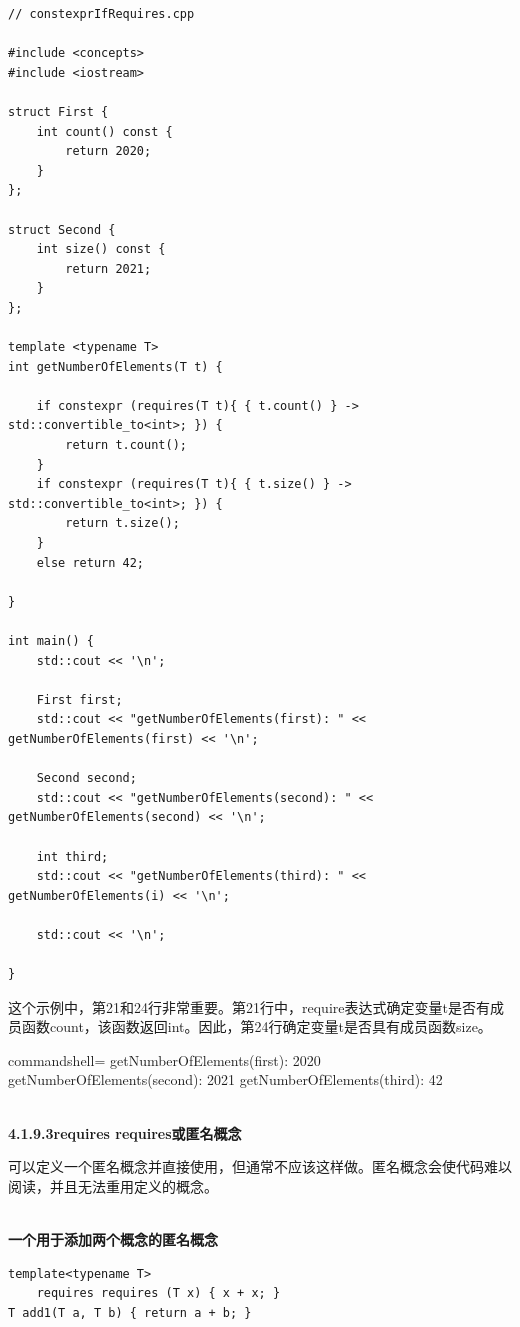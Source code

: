 \begin{lstlisting}[style=styleCXX]
// constexprIfRequires.cpp

#include <concepts>
#include <iostream>

struct First {
	int count() const {
		return 2020;
	}
};

struct Second {
	int size() const {
		return 2021;
	}
};

template <typename T>
int getNumberOfElements(T t) {

	if constexpr (requires(T t){ { t.count() } -> std::convertible_to<int>; }) {
		return t.count();
	}
	if constexpr (requires(T t){ { t.size() } -> std::convertible_to<int>; }) {
		return t.size();
	}
	else return 42;

}

int main() {
	std::cout << '\n';
	
	First first;
	std::cout << "getNumberOfElements(first): " << getNumberOfElements(first) << '\n';
	
	Second second;
	std::cout << "getNumberOfElements(second): " << getNumberOfElements(second) << '\n';
	
	int third;
	std::cout << "getNumberOfElements(third): " << getNumberOfElements(i) << '\n';
	
	std::cout << '\n';

}
\end{lstlisting}

这个示例中，第21和24行非常重要。第21行中，require表达式确定变量t是否有成员函数count，该函数返回int。因此，第24行确定变量t是否具有成员函数size。

\begin{tcblisting}{commandshell={}}
getNumberOfElements(first): 2020
getNumberOfElements(second): 2021
getNumberOfElements(third): 42
\end{tcblisting}

\hspace*{\fill} \\ %
\noindent
\textbf{4.1.9.3\hspace{0.2cm}requires requires或匿名概念}

可以定义一个匿名概念并直接使用，但通常不应该这样做。匿名概念会使代码难以阅读，并且无法重用定义的概念。

\hspace*{\fill} \\ %
\noindent
\textbf{一个用于添加两个概念的匿名概念}
\begin{lstlisting}[style=styleCXX]
template<typename T>
	requires requires (T x) { x + x; }
T add1(T a, T b) { return a + b; }
\end{lstlisting}

